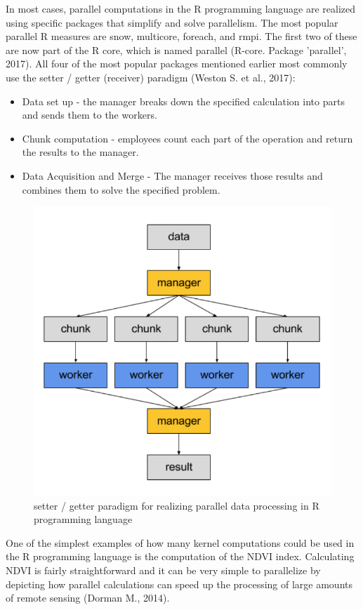{{ 	In most cases, parallel computations in the R programming language are realized using specific packages that simplify and solve parallelism. The most popular parallel R measures are snow, multicore, foreach, and rmpi. The first two of these are now part of the R core, which is named parallel (R-core. Package 'parallel', 2017). All four of the most popular packages mentioned earlier most commonly use the setter / getter (receiver) paradigm (Weston S. et al., 2017):
	
	\begin{itemize}
		\item Data set up - the manager breaks down the specified calculation into parts and sends them to the workers.
		\item Chunk computation - employees count each part of the operation and return the results to the manager.
		\item Data Acquisition and Merge - The manager receives those results and combines them to solve the specified problem.
	\end{itemize}

	\begin{figure}[H]
		\centering
		\includegraphics[width=0.9\linewidth]{images/parallel_execution_model.png}
		\caption{setter / getter paradigm for realizing parallel data processing in R programming language}
		\label{fig:par_exec_model}
	\end{figure}

	One of the simplest examples of how many kernel computations could be used in the R programming language is the computation of the NDVI index. Calculating NDVI is fairly straightforward and it can be very simple to parallelize by depicting how parallel calculations can speed up the processing of large amounts of remote sensing (Dorman M., 2014).
	
}}
